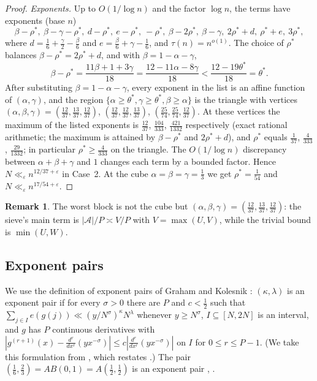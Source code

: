 \documentclass[11pt,reqno]{amsart}
\theoremstyle{definition}
\newtheorem{remark}[theorem]{Remark}
\newcommand{\eps}{\varepsilon}
\newcommand{\cA}{\mathcal A}
\begin{document}
\begin{proof}
\emph{Exponents.}  Up to $O(1/\log n)$ and the factor $\log n$, the
terms have exponents (base $n$)
\[
 \beta-\rho^*,\ \beta-\gamma-\rho^*,\ d-\rho^*,\ e-\rho^*,\ -\rho^*,\
 \beta-2\rho^*,\ \beta-\gamma,\ 2\rho^*+d,\ \rho^*+e,\ 3\rho^*,
\]
where $d=\frac16+\frac\gamma2-\frac\beta6$ and $e=\frac\beta6+\gamma-\frac16$, and
$\tau(n)=n^{o(1)}$.  The choice of $\rho^*$ balances
$\beta-\rho^*=2\rho^*+d$, and with $\beta=1-\alpha-\gamma$,
\[
 \beta-\rho^*=\frac{11\beta+1+3\gamma}{18}=\frac{12-11\alpha-8\gamma}{18}
 <\frac{12-19\theta^*}{18}=\theta^* .
\]
After substituting $\beta=1-\alpha-\gamma$, every exponent in the list
is an affine function of $(\alpha,\gamma)$, and the region
$\{\alpha\ge\theta^*,\gamma\ge\theta^*,\beta\ge\alpha\}$ is the triangle
with vertices $(\alpha,\beta,\gamma)=(\frac{12}{37},\frac{13}{37},\frac{12}{37})$,
$(\frac{12}{37},\frac{12}{37},\frac{13}{37})$,
$(\frac{25}{74},\frac{25}{74},\frac{12}{37})$.  At these vertices the
maximum of the listed exponents is $\frac{12}{37}$, $\frac{104}{333}$,
$\frac{421}{1332}$ respectively (exact rational arithmetic; the maximum is
attained by $\beta-\rho^*$ and $2\rho^*+d$), and $\rho^*$ equals
$\frac1{37}$, $\frac4{333}$, $\frac{29}{1332}$; in particular
$\rho^*\ge\frac4{333}$ on the triangle.  The $O(1/\log n)$ discrepancy
between $\alpha+\beta+\gamma$ and $1$ changes each term by a bounded
factor.  Hence $N\ll_\eps n^{12/37+\eps}$ in Case~2.  At the cube
$\alpha=\beta=\gamma=\frac13$ we get $\rho^*=\frac1{54}$ and
$N\ll_\eps n^{17/54+\eps}$.
\end{proof}

\begin{remark}
The worst block is not the cube but
$(\alpha,\beta,\gamma)=(\frac{12}{37},\frac{13}{37},\frac{12}{37})$: the
sieve's main term is $|\cA|/P\asymp V/P$ with $V=\max(U,V)$, while the
trivial bound is $\min(U,W)$.
\end{remark}

\subsection{Exponent pairs}\label{subsec:pairs}
We use the definition of exponent pairs of Graham and Kolesnik
\cite[Ch.~3]{GK}: $(\kappa,\lambda)$ is an exponent pair if for every
$\sigma>0$ there are $P$ and $c<\frac12$ such that
$\sum_{j\in I}e(g(j))\ll(y/N^\sigma)^\kappa N^\lambda$ whenever $y\ge N^\sigma$,
$I\subseteq[N,2N]$ is an interval, and $g$ has $P$ continuous
derivatives with
$|g^{(r+1)}(x)-\frac{d^r}{dx^r}(yx^{-\sigma})|\le c|\frac{d^r}{dx^r}(yx^{-\sigma})|$
on $I$ for $0\le r\le P-1$.  (We take this formulation from
\cite[\S1.1]{TY}, which restates \cite[Ch.~3]{GK}.)  The pair
$(\frac16,\frac23)=AB(0,1)=A(\frac12,\frac12)$ is an exponent pair
\cite[Ch.~3]{GK}, \cite[\S1.2]{TY}.
\end{document}
